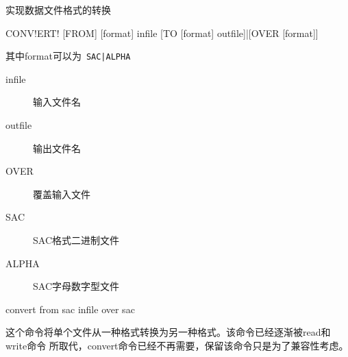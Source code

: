 \label{cmd:convert}

实现数据文件格式的转换

\begin{SACSTX}
CONV!ERT! [FROM] [format] infile [TO [format] outfile]|[OVER [format]]
\end{SACSTX}
其中format可以为~\lstinline{SAC|ALPHA}

\begin{description}
\item [infile] 输入文件名
\item [outfile] 输出文件名
\item [OVER] 覆盖输入文件
\item [SAC] SAC格式二进制文件
\item [ALPHA] SAC字母数字型文件
\end{description}

\begin{SACDFT}
convert from sac infile over sac
\end{SACDFT}

这个命令将单个文件从一种格式转换为另一种格式。该命令已经逐渐被read和write命令
所取代，convert命令已经不再需要，保留该命令只是为了兼容性考虑。
